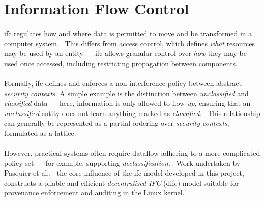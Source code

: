 



\section{Information Flow Control}
\label{sec:ifc}

\paragraph{} \acrshort{ifc} regulates how and where data is permitted to move and be transformed in a computer system.~\cite{ifc-data-prop} This differs from access control, which defines \textit{what} resources may be used by an entity --- \acrshort{ifc} allows granular control over \textit{how} they may be used once accessed, including restricting propagation between components. 

\paragraph{} Formally, \acrshort{ifc} defines and enforces a non-interference policy between abstract \textit{security contexts}. A simple example is the distinction between \textit{unclassified} and \textit{classified} data --- here, information is only allowed to flow \textit{up}, ensuring that an \textit{unclassified} entity does not learn anything marked as \textit{classified}.~\cite{Bell1973SecureCS} This relationship can generally be represented as a partial ordering over \textit{security contexts}, formulated as a lattice.~\cite{ifc-lattice}

\paragraph{} However, practical systems often require dataflow adhering to a more complicated policy set --- for example, supporting \textit{declassification}.~\cite{10.5555/794199.795122} Work undertaken by Pasquier et al.,~\cite{camflow} the core influence of the \acrshort{ifc} model developed in this project, constructs a pliable and efficient \textit{decentralised IFC} (\acrshort{difc}) model suitable for provenance enforcement and auditing in the Linux kernel.


